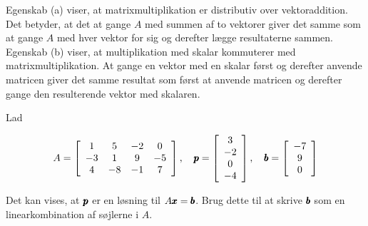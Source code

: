Egenskab (a) viser, at matrixmultiplikation er distributiv over vektoraddition. Det betyder, at det at gange \( A \) med summen af to vektorer giver det samme som at gange \( A \) med hver vektor for sig og derefter lægge resultaterne sammen.     Egenskab (b) viser, at multiplikation med skalar kommuterer med matrixmultiplikation. At gange en vektor med en skalar først og derefter anvende matricen giver det samme resultat som først at anvende matricen og derefter gange den resulterende vektor med skalaren.

\begin{example} Lad

\[
A = \left[\begin{array}{cccc}
1 & 5 & -2 & 0 \\
-3 & 1 & 9 & -5 \\
4 & -8 & -1 & 7
\end{array}\right], \quad \pmb{p} = \left[\begin{array}{c}
3 \\
-2 \\
0 \\
-4
\end{array}\right], \quad \pmb{b} = \left[\begin{array}{c}
-7 \\
9 \\
0
\end{array}\right]
\]

Det kan vises, at $\pmb{p}$ er en løsning til $A \pmb{x} = \pmb{b}$. Brug dette til at skrive $\pmb{b}$ som en linearkombination af søjlerne i $A$.
    
\end{example}  

